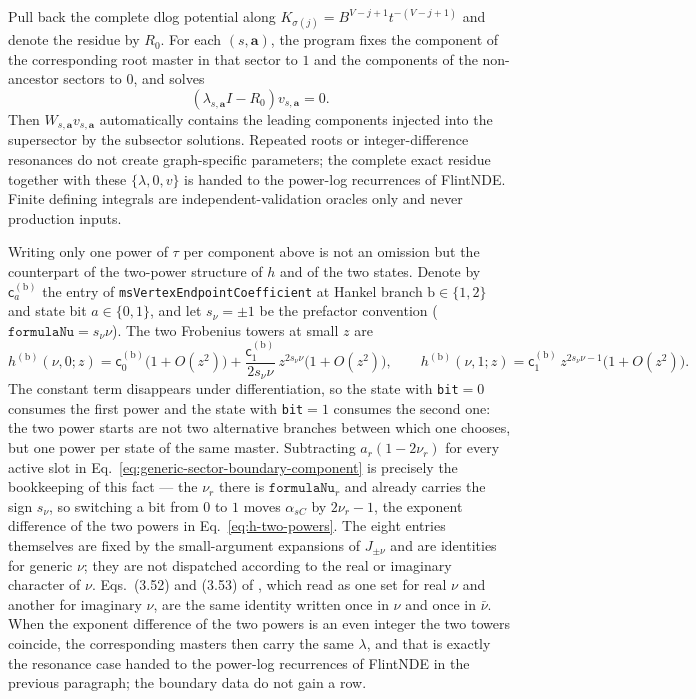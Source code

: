 \documentclass[11pt,a4paper]{article}
\begin{document}
Pull back the complete dlog potential along $K_{\sigma(j)}=B^{V-j+1}t^{-(V-j+1)}$ and denote the residue by $R_0$. For each $(s,\bm a)$, the program fixes the component of the corresponding root master in that sector to $1$ and the components of the non-ancestor sectors to $0$, and solves
\begin{equation}
 (\lambda_{s,\bm a}I-R_0)v_{s,\bm a}=0.
 \label{eq:generic-sector-indicial-vector}
\end{equation}
Then $W_{s,\bm a}v_{s,\bm a}$ automatically contains the leading components injected into the supersector by the subsector solutions. Repeated roots or integer-difference resonances do not create graph-specific parameters; the complete exact residue together with these $\{\lambda,0,v\}$ is handed to the power-log recurrences of FlintNDE. Finite defining integrals are independent-validation oracles only and never production inputs.

Writing only one power of $\tau$ per component above is not an omission but the counterpart of the two-power structure of $h$ and of the two states. Denote by $\mathsf c^{(\mathrm b)}_a$ the entry of \texttt{msVertexEndpointCoefficient} at Hankel branch $\mathrm b\in\{1,2\}$ and state bit $a\in\{0,1\}$, and let $s_\nu=\pm1$ be the prefactor convention ($\texttt{formulaNu}=s_\nu\nu$). The two Frobenius towers at small $z$ are
\begin{equation}
 h^{(\mathrm b)}(\nu,0;z)=\mathsf c^{(\mathrm b)}_0\bigl(1+O(z^2)\bigr)
 +\frac{\mathsf c^{(\mathrm b)}_1}{2s_\nu\nu}\,z^{2s_\nu\nu}\bigl(1+O(z^2)\bigr),
 \qquad
 h^{(\mathrm b)}(\nu,1;z)=\mathsf c^{(\mathrm b)}_1\,z^{2s_\nu\nu-1}\bigl(1+O(z^2)\bigr).
 \label{eq:h-two-powers}
\end{equation}
The constant term disappears under differentiation, so the state with \texttt{bit}$=0$ consumes the first power and the state with \texttt{bit}$=1$ consumes the second one: the two power starts are not two alternative branches between which one chooses, but one power per state of the same master. Subtracting $a_r(1-2\nu_r)$ for every active slot in Eq.~\eqref{eq:generic-sector-boundary-component} is precisely the bookkeeping of this fact --- the $\nu_r$ there is $\texttt{formulaNu}_r$ and already carries the sign $s_\nu$, so switching a bit from $0$ to $1$ moves $\alpha_{sC}$ by $2\nu_r-1$, the exponent difference of the two powers in Eq.~\eqref{eq:h-two-powers}. The eight entries themselves are fixed by the small-argument expansions of $J_{\pm\nu}$ and are identities for generic $\nu$; they are not dispatched according to the real or imaginary character of $\nu$. Eqs.~(3.52) and (3.53) of \cite{Chen:2024jms}, which read as one set for real $\nu$ and another for imaginary $\nu$, are the same identity written once in $\nu$ and once in $\bar\nu$. When the exponent difference of the two powers is an even integer the two towers coincide, the corresponding masters then carry the same $\lambda$, and that is exactly the resonance case handed to the power-log recurrences of FlintNDE in the previous paragraph; the boundary data do not gain a row.
\end{document}
